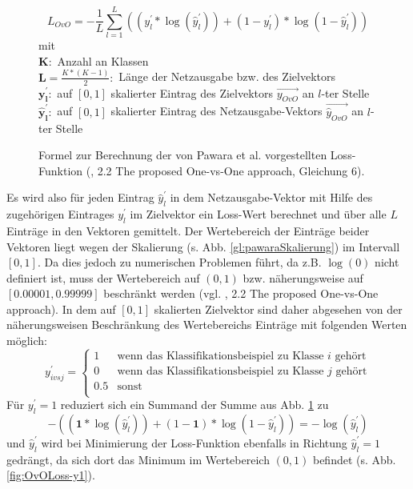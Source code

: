\begin{figure}[H]
\[L_{OvO} = - \frac{1}{L} \sum_{l=1}^{L}((y_{l}^{'} * \log{(\widehat{y}_{l}^{'})}) + (1 - y_{l}^{'}) * \log{(1-\widehat{y}_{l}^{'})})\]
mit\\
$\boldsymbol{K}:$ Anzahl an Klassen\\

$\boldsymbol{L}=\frac{K*(K-1)}{2}:$ Länge der Netzausgabe bzw. des Zielvektors\\

$\boldsymbol{y_{l}^{'}}:$ auf $[0, 1]$ skalierter Eintrag des Zielvektors $\overrightarrow{y_{OvO}}$ an $l$-ter Stelle\\

$\boldsymbol{\widehat{y}_{l}^{'}}:$ auf $[0, 1]$ skalierter Eintrag des Netzausgabe-Vektors $\overrightarrow{\widehat{y}_{OvO}}$ an $l$-ter Stelle\\


\caption{Formel zur Berechnung der von Pawara et al. vorgestellten Loss-Funktion (\cite{pawaraPaper}, 2.2 The proposed One-vs-One approach, Gleichung 6).}
\label{gl:pawaraLoss}
\end{figure}
Es wird also für jeden Eintrag $\widehat{y}_{l}^{'}$ in dem Netzausgabe-Vektor mit Hilfe des zugehörigen Eintrages $y_{l}^{'}$ im Zielvektor ein Loss-Wert berechnet und über alle $L$ Einträge in den Vektoren gemittelt. Der Wertebereich der Einträge beider Vektoren liegt wegen der Skalierung (s. Abb. \ref{gl:pawaraSkalierung}) im Intervall $[0,1]$. Da dies jedoch zu numerischen Problemen führt, da z.B. $\log{(0)}$ nicht definiert ist, muss der Wertebereich auf $(0, 1)$ bzw. näherungsweise auf $[0.00001, 0.99999]$ beschränkt werden (vgl. \cite{pawaraPaper}, 2.2 The proposed One-vs-One approach).
In dem auf $[0, 1]$ skalierten Zielvektor sind daher abgesehen von der näherungsweisen Beschränkung des Wertebereichs Einträge mit folgenden Werten möglich:
\[
y_{ivsj}^{'}=
\begin{cases}
1 & \text{wenn das Klassifikationsbeispiel zu Klasse } i \text{ gehört}\\
0 & \text{wenn das Klassifikationsbeispiel zu Klasse } j \text{ gehört}\\
0.5 & \text{sonst}\\
\end{cases}
\]
Für $y_{l}^{'} = 1$ reduziert sich ein Summand der Summe aus Abb. \ref{gl:pawaraLoss} zu
\[-((\boldsymbol{1} * \log{(\widehat{y}_{l}^{'})}) + (1 - \boldsymbol{1}) * \log{(1-\widehat{y}_{l}^{'})}) = -\log{(\widehat{y}_{l}^{'})}\]
und $\widehat{y}_{l}^{'}$ wird bei Minimierung der Loss-Funktion ebenfalls in Richtung $\widehat{y}_{l}^{'}=1$ gedrängt, da sich dort das Minimum im Wertebereich $(0, 1)$ befindet (s. Abb. \ref{fig:OvOLoss-y1}).


